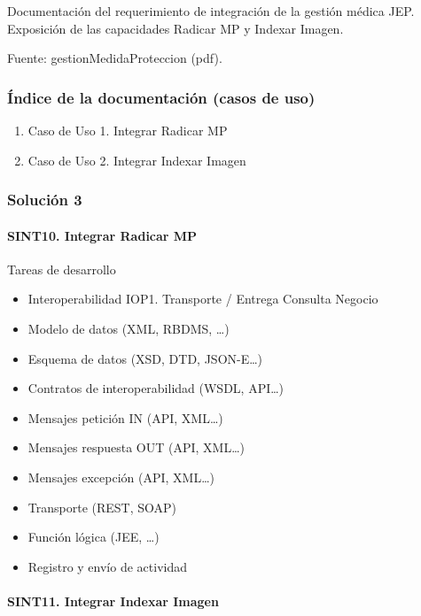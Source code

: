\documentclass[
  paper=a4,
  ,captions=tableheading
]{scrartcl}
\providecommand{\tightlist}{%
  \setlength{\itemsep}{0pt}\setlength{\parskip}{0pt}}
\begin{document}
Documentación del requerimiento de integración de la gestión médica JEP.
Exposición de las capacidades Radicar MP y Indexar Imagen.

Fuente: gestionMedidaProteccion (pdf).

\subsubsection{Índice de la documentación (casos de
uso)}\label{sec:uxedndice-de-la-documentaciuxf3n-casos-de-uso-1}

\begin{enumerate}
\def\labelenumi{\arabic{enumi}.}
\tightlist
\item
  Caso de Uso 1. Integrar Radicar MP
\item
  Caso de Uso 2. Integrar Indexar Imagen
\end{enumerate}

\subsubsection{Solución 3}\label{sec:soluciuxf3n-3}

\paragraph{SINT10. Integrar Radicar
MP}\label{sec:sint10.-integrar-radicar-mp}

Tareas de desarrollo

\begin{itemize}
\tightlist
\item
  Interoperabilidad IOP1. Transporte / Entrega Consulta Negocio
\item
  Modelo de datos (XML, RBDMS, \ldots)
\item
  Esquema de datos (XSD, DTD, JSON-E\ldots)
\item
  Contratos de interoperabilidad (WSDL, API\ldots)
\item
  Mensajes petición IN (API, XML\ldots)
\item
  Mensajes respuesta OUT (API, XML\ldots)
\item
  Mensajes excepción (API, XML\ldots)
\item
  Transporte (REST, SOAP)
\item
  Función lógica (JEE, \ldots)
\item
  Registro y envío de actividad
\end{itemize}

\paragraph{SINT11. Integrar Indexar
Imagen}\label{sec:sint11.-integrar-indexar-imagen}
\end{document}
